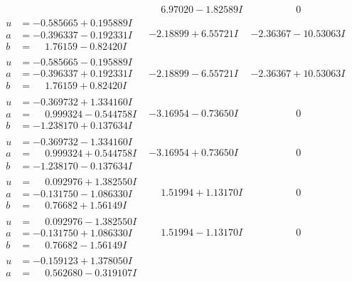 \documentclass[1p]{elsarticle_modified}
\theoremstyle{definition}
\begin{document}
$$\begin{array}{c|c|c}
 & \phantom{-}6.97020 - 1.82589 I & \phantom{-0.000000 } 0 \\ \hline\begin{aligned}
u &= -0.585665 + 0.195889 I \\
a &= -0.396337 - 0.192331 I \\
b &= \phantom{-}1.76159 - 0.82420 I\end{aligned}
 & -2.18899 + 6.55721 I & -2.36367 - 10.53063 I \\ \hline\begin{aligned}
u &= -0.585665 - 0.195889 I \\
a &= -0.396337 + 0.192331 I \\
b &= \phantom{-}1.76159 + 0.82420 I\end{aligned}
 & -2.18899 - 6.55721 I & -2.36367 + 10.53063 I \\ \hline\begin{aligned}
u &= -0.369732 + 1.334160 I \\
a &= \phantom{-}0.999324 - 0.544758 I \\
b &= -1.238170 + 0.137634 I\end{aligned}
 & -3.16954 - 0.73650 I & \phantom{-0.000000 } 0 \\ \hline\begin{aligned}
u &= -0.369732 - 1.334160 I \\
a &= \phantom{-}0.999324 + 0.544758 I \\
b &= -1.238170 - 0.137634 I\end{aligned}
 & -3.16954 + 0.73650 I & \phantom{-0.000000 } 0 \\ \hline\begin{aligned}
u &= \phantom{-}0.092976 + 1.382550 I \\
a &= -0.131750 - 1.086330 I \\
b &= \phantom{-}0.76682 + 1.56149 I\end{aligned}
 & \phantom{-}1.51994 + 1.13170 I & \phantom{-0.000000 } 0 \\ \hline\begin{aligned}
u &= \phantom{-}0.092976 - 1.382550 I \\
a &= -0.131750 + 1.086330 I \\
b &= \phantom{-}0.76682 - 1.56149 I\end{aligned}
 & \phantom{-}1.51994 - 1.13170 I & \phantom{-0.000000 } 0 \\ \hline\begin{aligned}
u &= -0.159123 + 1.378050 I \\
a &= \phantom{-}0.562680 - 0.319107 I \\

\end{aligned}
\end{array}$$
\end{document}
